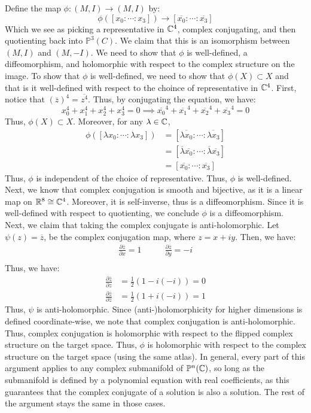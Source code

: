\documentclass[12pt]{article}
\begin{document}
\begin{solu}
    \bbni
    Define the map $\phi: (M, I) \to (M, I)$ by: 
    \[ \phi([x_0 : \cdots : x_3 ]) \to [\overline{x_0} : \cdots : \overline{x_3}]\]
    Which we see as picking a representative in $\mathbb C^4$, complex conjugating, and then quotienting back into $\mathbb{P}^3(C)$. We claim that this is an isomorphism between $(M, I)$ and $(M, -I)$. We need to show that $\phi$ is well-defined, a diffeomorphism, and holomorphic with respect to the complex structure on the image. \bbni
    To show that $\phi$ is well-defined, we need to show that $\phi(X) \subset X$ and that is it well-defined with respect to the choince of representative in $\mathbb C^4$. First, notice that $(\overline{z})^4 = \overline{z^4}$. Thus, by conjugating the equation, we have:
    \[ x_0^4 + x_1^4 + x_2^4 + x_3^4 = 0 \implies \overline{x_0}^4 + \overline{x_1}^4 + \overline{x_2}^4 + \overline{x_3}^4 = 0  \]
    Thus, $\phi(X) \subset X$. Moreover, for any $\lambda \in \mathbb C$, 
    \begin{align*}
        \phi([\lambda x_0 : \cdots : \lambda x_3]) &= [\overline{\lambda x_0}: \cdots : \overline{\lambda x_3}] \\
        &= [\overline{\lambda}\overline{x_0}: \cdots : \overline{\lambda} \overline{x_3}] \\
        &= [\overline{x_0}: \cdots : \overline{x_3}]
    \end{align*}
    Thus, $\phi$ is independent of the choice of representative. Thus, $\phi$ is well-defined. \bbni
    Next, we know that complex conjugation is smooth and bijective, as it is a linear map on $\mathbb R^8 \cong \mathbb C^4$. Moreover, it is self-inverse, thus is a diffeomorphism. Since it is well-defined with respect to quotienting, we conclude $\phi$ is a diffeomorphism. \bbni
    Next, we claim that taking the complex conjugate is anti-holomorphic. Let $\psi(z) = \overline{z}$, be the complex conjugation map, where $z = x + iy$. Then, we have:
    \begin{align*}
        \frac{\partial \overline{z}}{\partial x} = 1 & \qquad \frac{\partial \overline{z}}{\partial y} = -i \\
    \end{align*}
    Thus, we have:
    \begin{align*}
        \frac{\partial \overline{z}}{\partial z} &= \frac{1}{2}(1-i(-i)) = 0 \\
        \frac{\partial \overline{z}}{\partial \overline{z}} &= \frac{1}{2}(1+i(-i)) = 1
    \end{align*}
    Thus, $\psi$ is anti-holomorphic. Since (anti-)holomorphicity for higher dimensions is defined coordinate-wise, we note that complex conjugation is anti-holomorphic. Thus, complex conjugation is holomorphic with respect to the flipped complex structure on the target space. Thus, $\phi$ is holomorphic with respect to the complex structure on the target space (using the same atlas). \bbni 
    In general, every part of this argument applies to any complex submanifold of $\mathbb{P}^n(\mathbb C)$, so long as the submanifold is defined by a polynomial equation with real coefficients, as this guarantees that the complex conjugate of a solution is also a solution. The rest of the argument stays the same in those cases.
\end{solu}
\end{document}
